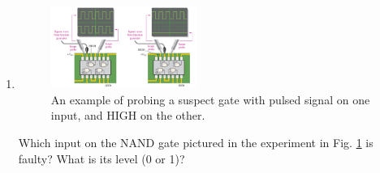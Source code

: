 \documentclass{article}
\begin{document}
\begin{enumerate}
\item 
\begin{figure}[hb]
\centering
\includegraphics[width=0.45\textwidth]{figures/troubleShoot.pdf}
\caption{\label{fig:troubleshoot} An example of probing a suspect gate with pulsed signal on one input, and HIGH on the other.}
\end{figure}
Which input on the NAND gate pictured in the experiment in Fig. \ref{fig:troubleshoot} is faulty?  What is its level (0 or 1)?
\end{enumerate}
\end{document}
